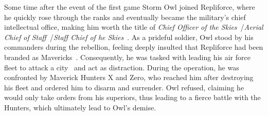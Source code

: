 Some time after the event of the first game Storm Owl joined Repliforce, where he quickly rose through the ranks and eventually became the military's chief intellectual office, making him worth the title of \textit{Chief Officer of the Skies}~\cite{wayback:X4_resources}/\textit{Aerial Chief of Staff}~\cite{wiki:Storm_owl,book:MMX_Complete_art}/\textit{Staff Chief of he Skies}~\cite{book:MH_field_guide}. As a prideful soldier, Owl stood by his commanders during the rebellion, feeling deeply insulted that Repliforce had been branded as Mavericks~\cite{wayback:X4_resources}. Consequently, he was tasked with leading his air force fleet to attack a city~\cite{wiki:Storm_owl} and act as distraction. During the operation, he was confronted by Maverick Hunters X and Zero, who reached him after destroying his fleet and ordered him to disarm and surrender. Owl refused, claiming he would only take orders from his superiors, thus leading to a fierce battle with the Hunters, which ultimately lead to Owl's demise. 

